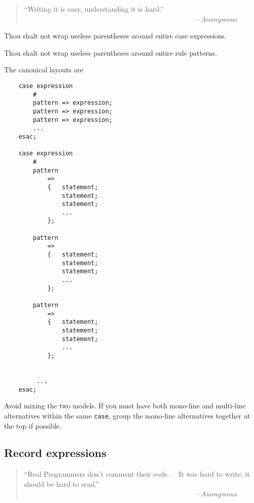 \begin{quote}\begin{tiny}
               ``Writing it is easy, understanding it is hard.''\newline
               ~~~~~~~~~~~~~~~~~~~~~~~~~~~~~~~~~~~~~~~~~~~~~~~~---{\em Anonymous}
\end{tiny}\end{quote}

Thou shalt not wrap useless parentheses around entire case expressions.

Thou shalt not wrap useless parentheses around entire rule patterns.

The canonical layouts are


\begin{verbatim}
    case expression
        #
        pattern => expression;
        pattern => expression;
        pattern => expression;
        ...
    esac;

    case expression
        #
        pattern
            =>
            {   statement;
                statement;
                statement;
                ...
            }; 

        pattern
            =>
            {   statement;
                statement;
                statement;
                ...
            }; 

        pattern
            =>
            {   statement;
                statement;
                statement;
                ...
            }; 


         ...
    esac;
\end{verbatim}


Avoid mixing the two models.  If you must 
have both mono-line and multi-line alternatives 
within the same {\tt case}, group the mono-line 
alternatives together at the top if possible.


\subsection{Record expressions}


\begin{quote}\begin{tiny}
               ``Real Programmers don't comment their code.\newline
               ~~It was hard to write; it should be hard to read.''\newline
               ~~~~~~~~~~~~~~~~~~~~~~~~~~~~~~~~~~~~~~~~~~~~~~~~---{\em Anonymous}
\end{tiny}\end{quote}



